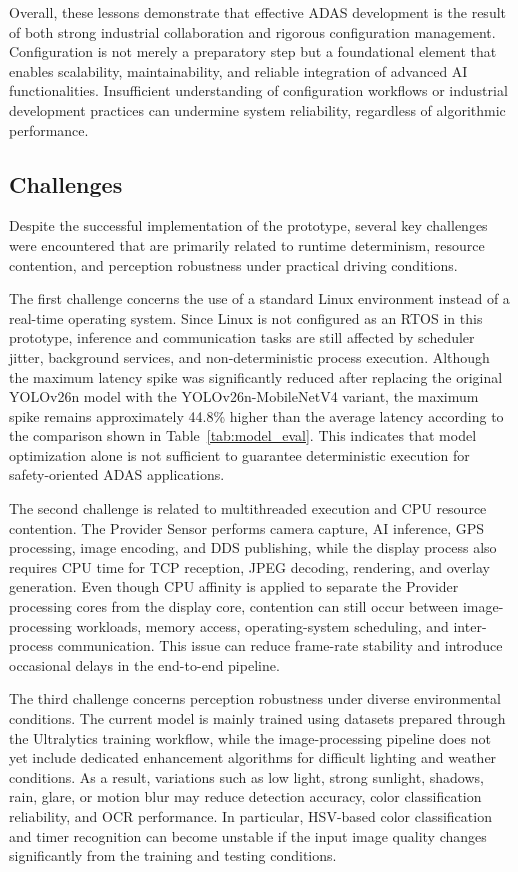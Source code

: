 Overall, these lessons demonstrate that effective ADAS development is the result of both strong industrial collaboration and rigorous configuration management. Configuration is not merely a preparatory step but a foundational element that enables scalability, maintainability, and reliable integration of advanced AI functionalities. Insufficient understanding of configuration workflows or industrial development practices can undermine system reliability, regardless of algorithmic performance.


\subsection{Challenges}

Despite the successful implementation of the prototype, several key challenges were encountered that are primarily related to runtime determinism, resource contention, and perception robustness under practical driving conditions.

The first challenge concerns the use of a standard Linux environment instead of a real-time operating system. Since Linux is not configured as an RTOS in this prototype, inference and communication tasks are still affected by scheduler jitter, background services, and non-deterministic process execution. Although the maximum latency spike was significantly reduced after replacing the original YOLOv26n model with the YOLOv26n-MobileNetV4 variant, the maximum spike remains approximately 44.8\% higher than the average latency according to the comparison shown in Table~\ref{tab:model_eval}. This indicates that model optimization alone is not sufficient to guarantee deterministic execution for safety-oriented ADAS applications.

The second challenge is related to multithreaded execution and CPU resource contention. The Provider Sensor performs camera capture, AI inference, GPS processing, image encoding, and DDS publishing, while the display process also requires CPU time for TCP reception, JPEG decoding, rendering, and overlay generation. Even though CPU affinity is applied to separate the Provider processing cores from the display core, contention can still occur between image-processing workloads, memory access, operating-system scheduling, and inter-process communication. This issue can reduce frame-rate stability and introduce occasional delays in the end-to-end pipeline.

The third challenge concerns perception robustness under diverse environmental conditions. The current model is mainly trained using datasets prepared through the Ultralytics training workflow, while the image-processing pipeline does not yet include dedicated enhancement algorithms for difficult lighting and weather conditions. As a result, variations such as low light, strong sunlight, shadows, rain, glare, or motion blur may reduce detection accuracy, color classification reliability, and OCR performance. In particular, HSV-based color classification and timer recognition can become unstable if the input image quality changes significantly from the training and testing conditions.

